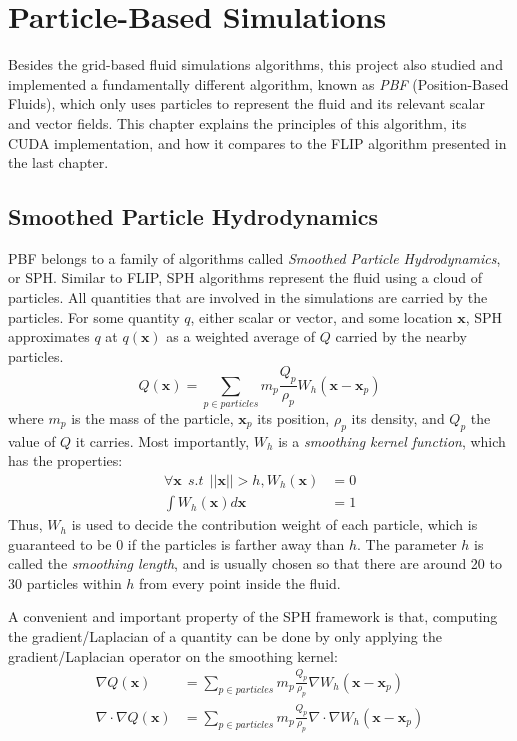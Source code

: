 \chapter{Particle-Based Simulations}
\label{chapter particle}



Besides the grid-based fluid simulations algorithms, this project also studied and implemented a fundamentally different algorithm, known as \textit{PBF} (Position-Based Fluids), which only uses particles to represent the fluid and its relevant scalar and vector fields. This chapter explains the principles of this algorithm, its CUDA implementation, and how it compares to the FLIP algorithm presented in the last chapter.

\section{Smoothed Particle Hydrodynamics}
PBF belongs to a family of algorithms called \textit{Smoothed Particle Hydrodynamics}, or SPH. Similar to FLIP, SPH algorithms represent the fluid using a cloud of particles. All quantities that are involved in the simulations are carried by the particles. For some quantity $q$, either scalar or vector, and some location $\textbf{x}$, SPH approximates $q$ at $q(\textbf{x})$ as a weighted average of $Q$ carried by the nearby particles.
$$
Q(\textbf{x}) = \sum_{p\in particles} m_p \frac{Q_p}{\rho_p} W_h(\textbf{x}-\textbf{x}_p)
$$
where $m_p$ is the mass of the particle, $\textbf{x}_p$ its position, $\rho_p$ its density, and $Q_p$ the value of $Q$ it carries. Most importantly, $W_h$ is a \textit{smoothing kernel function}, which has the properties:
\begin{equation}
    \label{eqn SPH basic}
    \begin{aligned}
        \forall\textbf{x}~~s.t~~||\textbf{x}||>h, W_h(\textbf{x}) &= 0\\
        \int W_h(\textbf{x}) d\textbf{x} &= 1
    \end{aligned}
\end{equation}
Thus, $W_h$ is used to decide the contribution weight of each particle, which is guaranteed to be $0$ if the particles is farther away than $h$. The parameter $h$ is called the \textit{smoothing length}, and is usually chosen so that there are around 20 to 30 particles within $h$ from every point inside the fluid.

A convenient and important property of the SPH framework is that, computing the gradient/Laplacian of a quantity can be done by only applying the gradient/Laplacian operator on the smoothing kernel:
\begin{equation}
    \label{eqn SPH derivative}
    \begin{aligned}
        \nabla Q(\textbf{x}) &= \sum_{p\in particles} m_p \frac{Q_p}{\rho_p} \nabla W_h(\textbf{x}-\textbf{x}_p) \\
        \nabla \cdot \nabla Q(\textbf{x}) &= \sum_{p\in particles} m_p \frac{Q_p}{\rho_p} \nabla \cdot \nabla W_h(\textbf{x}-\textbf{x}_p)
    \end{aligned}
\end{equation}


